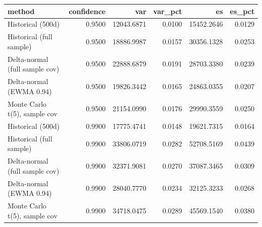 \begin{tabular}{lrrrrr}
\toprule
method & confidence & var & var_pct & es & es_pct \\
\midrule
Historical (500d) & 0.9500 & 12043.6871 & 0.0100 & 15452.2646 & 0.0129 \\
Historical (full sample) & 0.9500 & 18886.9987 & 0.0157 & 30356.1328 & 0.0253 \\
Delta-normal (full sample cov) & 0.9500 & 22888.6879 & 0.0191 & 28703.3380 & 0.0239 \\
Delta-normal (EWMA 0.94) & 0.9500 & 19826.3442 & 0.0165 & 24863.0355 & 0.0207 \\
Monte Carlo t(5), sample cov & 0.9500 & 21154.0990 & 0.0176 & 29990.3559 & 0.0250 \\
Historical (500d) & 0.9900 & 17775.4741 & 0.0148 & 19621.7315 & 0.0164 \\
Historical (full sample) & 0.9900 & 33806.0719 & 0.0282 & 52708.5169 & 0.0439 \\
Delta-normal (full sample cov) & 0.9900 & 32371.9081 & 0.0270 & 37087.3465 & 0.0309 \\
Delta-normal (EWMA 0.94) & 0.9900 & 28040.7770 & 0.0234 & 32125.3233 & 0.0268 \\
Monte Carlo t(5), sample cov & 0.9900 & 34718.0475 & 0.0289 & 45569.1540 & 0.0380 \\
\bottomrule
\end{tabular}
